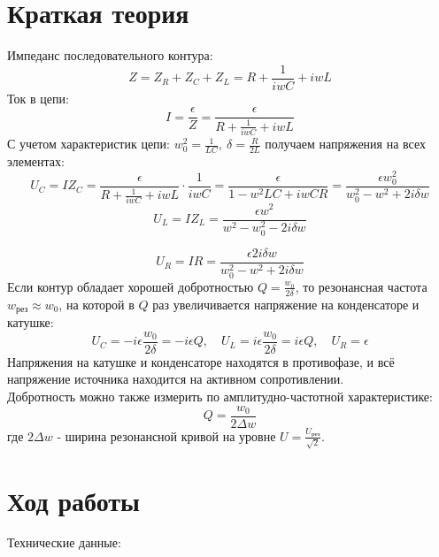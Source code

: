 \documentclass[a4paper, 12pt]{article}
\begin{document}
\section*{Краткая теория}
	Импеданс последовательного контура:
	\[Z = Z_R + Z_C + Z_L = R + \frac{1}{iwC} + iwL\]
	Ток в цепи:
	\[I = \frac{\epsilon}{Z} = \frac{\epsilon}{R + \frac{1}{iwC} + iwL}\]
	С учетом характеристик цепи: $w_0^2 = \frac{1}{LC}, \ \delta = \frac{R}{2L}$ получаем напряжения на всех элементах:
	\[U_C = IZ_C = \frac{\epsilon}{R + \frac{1}{iwC} + iwL} \cdot \frac{1}{iwC} = \frac{\epsilon}{1 - w^2LC + iwCR} = \frac{\epsilon w_0^2}{w_0^2 - w^2 + 2i\delta w}\]
	\[U_L = IZ_L = \frac{\epsilon w^2}{w^2 - w_0^2 - 2i\delta w}\]
	
	\[U_R = IR = \frac{\epsilon 2i\delta w}{w_0^2 - w^2 + 2i\delta w}\]
	Если контур обладает хорошей добротностью $Q = \frac{w_0}{2\delta}$, то резонансная частота $w_\text{рез} \approx w_0$, на которой в $Q$ раз увеличивается напряжение на конденсаторе и катушке:
	\[U_C = -i\epsilon \frac{w_0}{2\delta} = -i\epsilon Q, \quad U_L = i\epsilon \frac{w_0}{2\delta} = i\epsilon Q, \quad U_R = \epsilon \]
	Напряжения на катушке и конденсаторе находятся в противофазе, и всё напряжение источника находится на активном сопротивлении.\\
	Добротность можно также измерить по амплитудно-частотной характеристике: \[Q = \frac{w_0}{2\Delta w}\] где $2\Delta w$ - ширина резонансной кривой на уровне $U = \frac{U_{\text{рез}}}{\sqrt{2}}$.
	
	
	\newpage
\section{Ход работы}
Технические данные:
\end{document}

